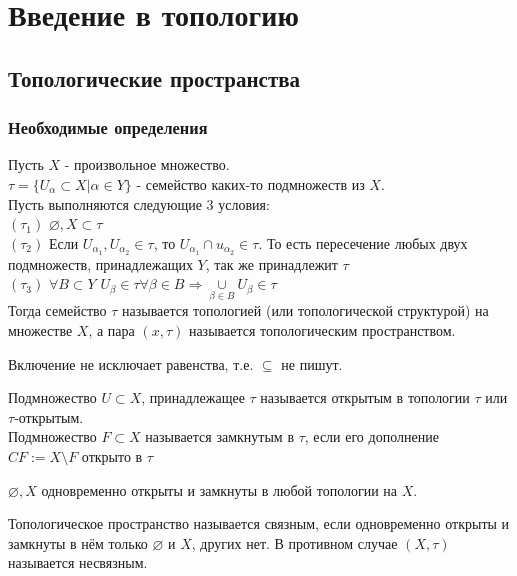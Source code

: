 \chapter{Введение в топологию}
\section{Топологические пространства}
\subsection{Необходимые определения}
\begin{definition}[Топология]
Пусть $X$ - произвольное множество.\\ $\tau =\{U_{\alpha}{\subset}X|\alpha{\in}Y\}$ - семейство каких-то подмножеств из $X$.\\ Пусть выполняются следующие 3 условия:\\ $(\tau_1)$ $\varnothing, X{\subset}\tau$\\
$(\tau_2)$ Если $U_{\alpha_1}, U_{\alpha_2}{\in}\tau$, то $U_{\alpha_1}{\cap}u_{\alpha_2}{\in}\tau$. То есть пересечение любых двух подмножеств, принадлежащих $Y$, так же принадлежит $\tau$\\
$(\tau_3)$ $\forall B{\subset}Y$ $U_{\beta}{\in}\tau \forall \beta{\in}B \Rightarrow \underset{\beta{\in}B}{\cup}U_{\beta}{\in}\tau$\\
Тогда семейство $\tau$ называется топологией (или топологической структурой) на множестве $X$, а пара $(x,\tau)$ называется топологическим пространством.
\end{definition}

\begin{remark}
Включение не исключает равенства, т.е. $\subseteq$ не пишут.
\end{remark}

\begin{definition}
Подмножество $U{\subset}X$, принадлежащее $\tau$ называется открытым в топологии $\tau$ или $\tau$-открытым.\\
Подмножество $F{\subset}X$ называется замкнутым в $\tau$, если его дополнение $CF:=X{\setminus}F$ открыто в $\tau$
\end{definition}

\begin{remark}
$\varnothing, X$ одновременно открыты и замкнуты в любой топологии на $X$.
\end{remark}

\begin{definition}
Топологическое пространство называется связным, если одновременно открыты и замкнуты в нём только $\varnothing$ и $X$, других нет. В противном случае $(X,\tau)$ называется несвязным.
\end{definition}

